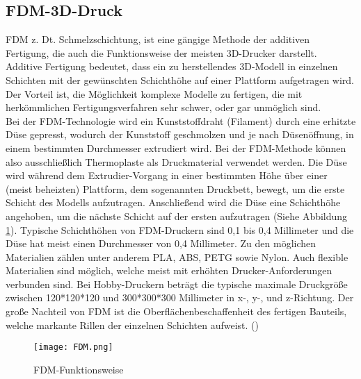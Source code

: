 \subsection{FDM-3D-Druck}
\label{subsec:tFDM}
\ac{FDM} z. Dt. Schmelzschichtung, ist eine gängige Methode der additiven Fertigung, die auch die Funktionsweise der meisten \ac{3D}-Drucker darstellt. Additive Fertigung bedeutet, dass ein zu herstellendes \ac{3D}-Modell in einzelnen Schichten mit der gewünschten Schichthöhe auf einer Plattform aufgetragen wird. Der Vorteil ist, die Möglichkeit komplexe Modelle zu fertigen, die mit herkömmlichen Fertigungsverfahren sehr schwer, oder gar unmöglich sind.\\
Bei der \ac{FDM}-Technologie wird ein Kunststoffdraht (Filament) durch eine erhitzte Düse gepresst, wodurch der Kunststoff geschmolzen und je nach Düsenöffnung, in einem bestimmten Durchmesser extrudiert wird. Bei der \ac{FDM}-Methode können also ausschließlich Thermoplaste als Druckmaterial verwendet werden. Die Düse wird während dem Extrudier-Vorgang in einer bestimmten Höhe über einer (meist beheizten) Plattform, dem sogenannten Druckbett, bewegt, um die erste Schicht des Modells aufzutragen. Anschließend wird die Düse eine Schichthöhe angehoben, um die nächste Schicht auf der ersten aufzutragen (Siehe Abbildung \ref{fig:FDM}). Typische Schichthöhen von \ac{FDM}-Druckern sind 0,1 bis 0,4 Millimeter und die Düse hat meist einen Durchmesser von 0,4 Millimeter. Zu den möglichen Materialien zählen unter anderem \ac{PLA}, \ac{ABS}, \ac{PETG} sowie Nylon. Auch flexible Materialien sind möglich, welche meist mit erhöhten Drucker-Anforderungen verbunden sind. Bei Hobby-Druckern beträgt die typische maximale Druckgröße zwischen 120*120*120 und 300*300*300 Millimeter in x-, y-, und z-Richtung. Der große Nachteil von \ac{FDM} ist die Oberflächenbeschaffenheit des fertigen Bauteils, welche markante Rillen der einzelnen Schichten aufweist. (\cite{alexandreFDM})
\begin{figure}[h]
\centering
\texttt{[image: FDM.png]}
\caption{FDM-Funktionsweise}
\label{fig:FDM}
\end{figure}

